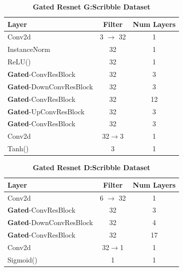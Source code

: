 \documentclass[10pt,twocolumn,letterpaper]{article}
\begin{document}
\begin{table}[ht]
\caption{\textbf{Gated Resnet G:Scribble Dataset}}
\centering %
\begin{tabular}{l c c} %
\toprule%
\textbf{Layer} & \textbf{Filter} & \textbf{Num Layers} \\
\midrule
Conv2d & 3 $\rightarrow$ 32 & 1\\
InstanceNorm & 32 & 1 \\ %
ReLU() & 32 & 1\\
\hdashline%
\textbf{Gated}-ConvResBlock & 32 & 3\\
\textbf{Gated}-DownConvResBlock & 32 & 3\\
\textbf{Gated}-ConvResBlock & 32 & 12\\
\textbf{Gated}-UpConvResBlock & 32 & 3\\
\textbf{Gated}-ConvResBlock & 32 & 3\\
\hdashline
Conv2d & 32$\rightarrow$3 & 1 \\
Tanh() & 3 & 1 \\
\bottomrule%
\end{tabular}
\label{table:resnet_g_scribble} %
\end{table}

\begin{table}[ht]
\caption{\textbf{Gated Resnet D:Scribble Dataset}}
\centering %
\begin{tabular}{l c c} %
\toprule%
\textbf{Layer} & \textbf{Filter} & \textbf{Num Layers} \\
\midrule
Conv2d & 6 $\rightarrow$ 32 & 1\\
\hdashline%
\textbf{Gated}-ConvResBlock & 32 & 3\\
\textbf{Gated}-DownConvResBlock & 32 & 4\\
\textbf{Gated}-ConvResBlock & 32 & 17\\
\hdashline
Conv2d & 32$\rightarrow$1 & 1 \\
Sigmoid() & 1 & 1 \\
\bottomrule%
\end{tabular}
\label{table:resnet_d_scribble} %
\end{table}
\end{document}
